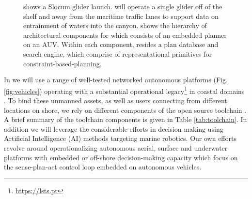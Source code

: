 \begin{figure}[!t]
{    %
     shows a \soc Slocum glider launch. \soc will
    operate a single glider off of the shelf and away from the
    maritime traffic lanes to support data on entrainment of waters
    into the \naz canyon.
     shows the hierarchy of architectural
    components for \rx \cite{py10,rajan12,rajan12b} which consists of
    an embedded planner on an AUV. Within each \rx component, resides
    a plan database and search engine, which comprise of
    representational primitives for constraint-based-planning.}
  \label{fig:ai-figs}
\end{figure}

In \proj we will use a range of well-tested networked autonomous
platforms (Fig. \ref{fig:vehicles}) operating with a substantial
operational legacy\footnote{\url{https://lsts.pt}} in coastal domains
\cite{pinto13,pinto14,sousa16,Ferreira2018,Pinto2018MultipleAV}. To
bind these unmanned assets, as well as users connecting from different
locations on shore, we rely on different components of the open source
\ls toolchain \cite{pinto2013lsts}. A brief summary of the toolchain
components is given in Table \ref{tab:toolchain}. In addition we will
leverage the considerable efforts in decision-making using Artificial
Intelligence (AI) methods targeting marine robotics. Our own efforts
revolve around operationalizing autonomous aerial, surface and
underwater platforms with embedded or off-shore decision-making
capacity which focus on the sense-plan-act control loop embedded on
autonomous vehicles.

